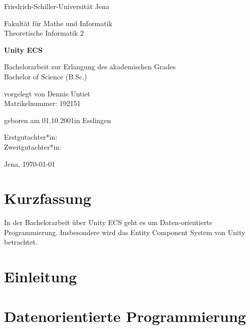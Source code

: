 \documentclass[12pt, titlepage]{article}
\newcommand{\myTitle}{Unity ECS}
\begin{document}
\begin{titlepage}
\centering
{\huge Friedrich-Schiller-Universität Jena \par}
{\large Fakultät für Mathe und Informatik\\Theoretische Informatik 2\par}
\vspace{1.5cm}
{\huge\bfseries \myTitle\par}
\vspace{2cm}
{\Large Bachelorarbeit zur Erlangung des akademischen Grades\\Bachelor of Science (B.Sc.) \par}
\vspace{3cm}
{\large vorgelegt von Dennis Untiet\\Matrikelnummer: 192151\par}
\vspace{0.5cm}
{\large geboren am 01.10.2001\quad in Esslingen\par}
\vspace{2cm}
{\large Erstgutachter*in:\\Zweitgutachter*in:\par} 
\vfill
{\Large Jena, \today}
\end{titlepage}
\section{Kurzfassung}
In der Bachelorarbeit über {\myTitle} geht es um Daten-orientierte Programmierung. Insbesondere wird das Entity Component System von Unity betrachtet.
\newpage
\tableofcontents
\newpage
\section{Einleitung}
\newpage
\section{Datenorientierte Programmierung}
\end{document}
